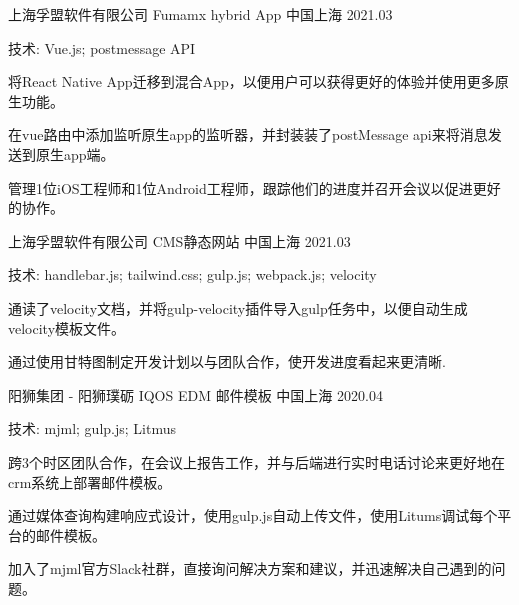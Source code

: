 

\begin{cventries}

  \cventry
    {上海孚盟软件有限公司} %
    {Fumamx hybrid App} %
    {中国上海} %
    {2021.03} %
    {
      \begin{cvitems} %
        \item {技术: Vue.js; postmessage API}
        \item {将React Native App迁移到混合App，以便用户可以获得更好的体验并使用更多原生功能。}
        \item {在vue路由中添加监听原生app的监听器，并封装装了postMessage api来将消息发送到原生app端。}
        \item {管理1位iOS工程师和1位Android工程师，跟踪他们的进度并召开会议以促进更好的协作。}
      \end{cvitems}
    }


    \cventry
    {上海孚盟软件有限公司} %
    {CMS静态网站} %
    {中国上海} %
    {2021.03} %
    {
      \begin{cvitems} %
        \item {技术: handlebar.js; tailwind.css; gulp.js; webpack.js; velocity }
        \item {通读了velocity文档，并将gulp-velocity插件导入gulp任务中，以便自动生成velocity模板文件。}
        \item {通过使用甘特图制定开发计划以与团队合作，使开发进度看起来更清晰.}
      \end{cvitems}
    }

    \cventry
    {阳狮集团 - 阳狮璞砺} %
    {IQOS EDM 邮件模板} %
    {中国上海} %
    {2020.04} %
    {
      \begin{cvitems} %
        \item {技术: mjml; gulp.js; Litmus }
        \item {跨3个时区团队合作，在会议上报告工作，并与后端进行实时电话讨论来更好地在crm系统上部署邮件模板。}
        \item {通过媒体查询构建响应式设计，使用gulp.js自动上传文件，使用Litums调试每个平台的邮件模板。}
        \item {加入了mjml官方Slack社群，直接询问解决方案和建议，并迅速解决自己遇到的问题。}
      \end{cvitems}
    }


\end{cventries}
